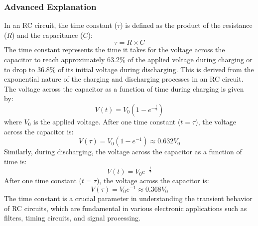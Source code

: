 \subsubsection{Advanced Explanation}
In an RC circuit, the time constant (\(\tau\)) is defined as the product of the resistance (\(R\)) and the capacitance (\(C\)):
\[
\tau = R \times C
\]
The time constant represents the time it takes for the voltage across the capacitor to reach approximately 63.2\% of the applied voltage during charging or to drop to 36.8\% of its initial voltage during discharging. This is derived from the exponential nature of the charging and discharging processes in an RC circuit. The voltage across the capacitor as a function of time during charging is given by:
\[
V(t) = V_0 \left(1 - e^{-\frac{t}{\tau}}\right)
\]
where \(V_0\) is the applied voltage. After one time constant (\(t = \tau\)), the voltage across the capacitor is:
\[
V(\tau) = V_0 \left(1 - e^{-1}\right) \approx 0.632 V_0
\]
Similarly, during discharging, the voltage across the capacitor as a function of time is:
\[
V(t) = V_0 e^{-\frac{t}{\tau}}
\]
After one time constant (\(t = \tau\)), the voltage across the capacitor is:
\[
V(\tau) = V_0 e^{-1} \approx 0.368 V_0
\]
The time constant is a crucial parameter in understanding the transient behavior of RC circuits, which are fundamental in various electronic applications such as filters, timing circuits, and signal processing.

